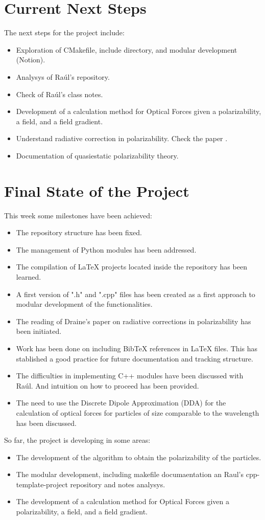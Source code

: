 \documentclass{article}
\begin{document}
\section{Current Next Steps}
The next steps for the project include:
\begin{itemize}
    \item Exploration of CMakefile, include directory, and modular development (Notion).
    \item Analysys of Raúl's  repository.
    \item Check of Raúl's class notes.
    \item Development of a calculation method for Optical Forces given a polarizability, a field, and a field gradient.
    \item Understand radiative correction in polarizability. Check the paper \cite{Draine1988ApJ...333..848D}.
    \item Documentation of quasiestatic polarizability theory. 
\end{itemize}

\section{Final State of the Project}
This week some milestones have been achieved:
\begin{itemize}
    \item The repository structure has been fixed.
    \item The management of Python modules has been addressed.
    \item The compilation of LaTeX projects located inside the repository has been learned.
    \item A first version of ".h" and ".cpp" files has been created as a first approach to modular development of the functionalities.
    \item The reading of Draine's paper on radiative corrections in polarizability has been initiated.
    \item Work has been done on including BibTeX references in LaTeX files. This has stablished a good practice for future documentation and tracking structure.
    \item The difficulties in implementing C++ modules have been discussed with Raúl. And intuition on how to proceed has been provided.
    \item The need to use the Discrete Dipole Approximation (DDA) for the calculation of optical forces for particles of size comparable to the wavelength has been discussed.
\end{itemize}
So far, the project is developing in some areas:
\begin{itemize}
    \item The development of the algorithm to obtain the polarizability of the particles.
    \item The modular development, including makefile documaentation an Raul's cpp-template-project repository and notes analysys.
    \item The development of a calculation method for Optical Forces given a polarizability, a field, and a field gradient.
\end{itemize}
 
\printbibliography
\end{document}
